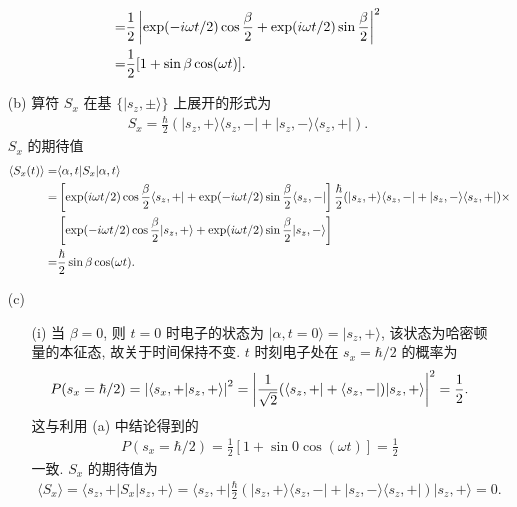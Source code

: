\documentclass{assignment}
\begin{document}
\begin{sol}
\begin{itemize}
\begin{align}
            \notag=&\frac{1}{2}\left\lvert\exp(-i\omega t/2)\cos\frac{\beta}{2}+\exp(i\omega t/2)\sin\frac{\beta}{2}\right\rvert^2\\
            =&\frac{1}{2}[1+\sin\beta\cos(\omega t)].
        \end{align}
        \item[(b)] 算符 $S_x$ 在基 $\{\lvert s_z,\pm\rangle\}$ 上展开的形式为
        \begin{align}
            S_x=\frac{\hbar}{2}(\lvert s_z,+\rangle\langle s_z,-\rvert+\lvert s_z,-\rangle\langle s_z,+\rvert).
        \end{align}
        $S_x$ 的期待值
        \begin{align}
            \notag\langle S_x(t)\rangle=&\langle\alpha,t\rvert S_x\lvert\alpha,t\rangle\\
            \notag=&\left[\exp(i\omega t/2)\cos\frac{\beta}{2}\langle s_z,+\rvert+\exp(-i\omega t/2)\sin\frac{\beta}{2}\langle s_z,-\rvert\right]\frac{\hbar}{2}(\lvert s_z,+\rangle\langle s_z,-\rvert+\lvert s_z,-\rangle\langle s_z,+\rvert)\times\\
            \notag&\left[\exp(-i\omega t/2)\cos\frac{\beta}{2}\lvert s_z,+\rangle+\exp(i\omega t/2)\sin\frac{\beta}{2}\lvert s_z,-\rangle\right]\\
            =&\frac{\hbar}{2}\sin\beta\cos(\omega t).
        \end{align}
        \item[(c)] 
        \begin{itemize}
            \item[(i)] 当 $\beta=0$, 则 $t=0$ 时电子的状态为 $\lvert\alpha,t=0\rangle=\lvert s_z,+\rangle$, 该状态为哈密顿量的本征态, 故关于时间保持不变. $t$ 时刻电子处在 $s_x=\hbar/2$ 的概率为
            \begin{align}
                P(s_x=\hbar/2)=\left\lvert\langle s_x,+\vert s_z,+\rangle\right\rvert^2=\left\lvert\frac{1}{\sqrt{2}}(\langle s_z,+\rvert+\langle s_z,-\rvert)\lvert s_z,+\rangle\right\rvert^2=\frac{1}{2}.
            \end{align}
            这与利用 (a) 中结论得到的
            \begin{align}
                P(s_x=\hbar/2)=\frac{1}{2}[1+\sin 0\cos(\omega t)]=\frac{1}{2}
            \end{align}
            一致.
            $S_x$ 的期待值为
            \begin{align}
                \langle S_x\rangle=\langle s_z,+\rvert S_x\lvert s_z,+\rangle=\langle s_z,+\rvert\frac{\hbar}{2}(\lvert s_z,+\rangle\langle s_z,-\rvert+\lvert s_z,-\rangle\langle s_z,+\rvert)\lvert s_z,+\rangle=0.

\end{align}
\end{itemize}
\end{itemize}
\end{sol}
\end{document}
